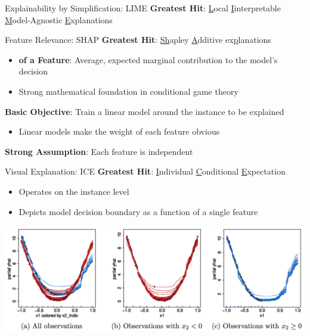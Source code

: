 \documentclass[11pt,dvipsnames,usenames,aspectratio=169]{beamer}  %
\begin{document}
\begin{frame}{Explainability by Simplification: LIME}
  \noindent
  \textbf{Greatest Hit}: \underline{L}ocal \underline{I}interpretable \underline{M}odel-Agnostic \underline{E}xplanations~\citep{Ribeiro:2016}

\end{frame}

\begin{frame}{Feature Relevance: SHAP}
  \noindent
  \textbf{Greatest Hit}: \underline{Sh}apley \underline{A}dditive ex\underline{p}lanations~\citep{Lundberg:2017}
  \begin{itemize}
    \item \textbf{ of a Feature}: Average, expected marginal contribution to the model's decision
    \item Strong mathematical foundation in conditional game theory
  \end{itemize}

  \vspace{18pt}
  \noindent
  \textbf{Basic Objective}: Train a linear model around the instance to be explained
  \begin{itemize}
    \item Linear models make the weight of each feature obvious
  \end{itemize}

  \vspace{18pt}
  \noindent
  \textbf{Strong Assumption}: Each feature is independent
\end{frame}

\begin{frame}{Visual Explanation: ICE}
      \textbf{Greatest Hit}: \underline{I}ndividual \underline{C}onditional \underline{E}xpectation~\citep{Goldstein:2015}

      \begin{itemize}
        \setlength{\itemsep}{10pt}
        \item Operates on the instance level
        \item Depicts model decision boundary as a function of a single feature
      \end{itemize}

      \vspace{8pt}
      \begin{center}
        \includegraphics[scale=0.2]{ice_plots.png}
      \end{center}
\end{frame}
\end{document}
